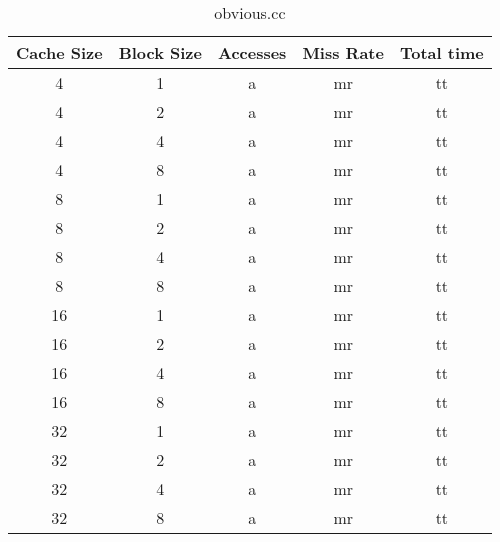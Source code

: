 \documentclass[letterpaper, 12pt, oneside]{memoir}
\begin{document}
\begin{table}[H]
\centering
\begin{tabular}{c|c|c|c|c}
    Cache Size  & Block Size    & Accesses & Miss Rate & Total time \\ \hline
    4   & 1 & a & mr & tt \\ 
    4   & 2 & a & mr & tt \\ 
    4   & 4 & a & mr & tt \\ 
    4   & 8 & a & mr & tt \\ 
    8   & 1 & a & mr & tt \\ 
    8   & 2 & a & mr & tt \\ 
    8   & 4 & a & mr & tt \\ 
    8   & 8 & a & mr & tt \\ 
    16  & 1 & a & mr & tt \\ 
    16  & 2 & a & mr & tt \\ 
    16  & 4 & a & mr & tt \\ 
    16  & 8 & a & mr & tt \\ 
    32  & 1 & a & mr & tt \\ 
    32  & 2 & a & mr & tt \\ 
    32  & 4 & a & mr & tt \\ 
    32  & 8 & a & mr & tt \\ 
\end{tabular}
\caption{obvious.cc}
\end{table}
\end{document}
